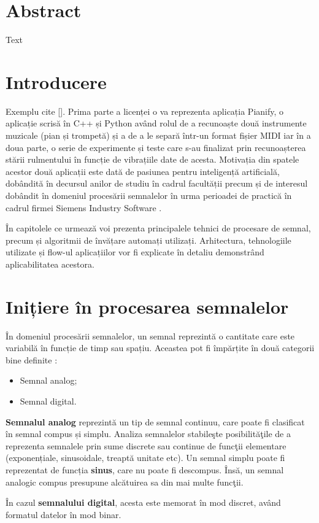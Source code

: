 \documentclass[a4paper,12pt]{report}
\begin{document}
	
	
	
	\newpage
	\tableofcontents
	\newpage
	\section{Abstract}
	Text
	\clearpage
	
	\section{Introducere}
	Exemplu cite [\cite{articol_ibima}]. Prima parte a licenței o va reprezenta aplicația Pianify, o aplicație scrisă în C++ și Python având rolul de a recunoaște două instrumente muzicale (pian și trompetă) și a de a le separă într-un format fișier MIDI iar în a doua parte, o serie de experimente și teste care s-au finalizat prin recunoașterea stării rulmentului în funcție de vibrațiile date de acesta. Motivația din spatele acestor două aplicații este dată de pasiunea pentru inteligență artificială, dobândită în decursul anilor de studiu în cadrul facultății precum și de interesul dobândit în domeniul procesării semnalelor în urma perioadei de practică în cadrul firmei Siemens Industry Software .
	
	În capitolele ce urmează voi prezenta principalele tehnici de procesare de semnal, precum și algoritmii de învățare automați utilizați. Arhitectura, tehnologiile utilizate și flow-ul aplicațiilor vor fi explicate în detaliu demonstrând aplicabilitatea acestora.
	
	\clearpage
	
    \section{Inițiere în procesarea semnalelor}
    În domeniul procesării semnalelor, un semnal reprezintă o cantitate care este variabilă în funcție de timp sau spațiu. Aceastea pot fi împărțite în două categorii bine definite \cite{analogVSdigital}: 
    
    \begin{itemize}
    	\item Semnal analog;
    	\item Semnal digital.
    \end{itemize}

    \textbf{Semnalul analog} reprezintă un tip de semnal continuu, care poate fi clasificat în semnal compus și simplu. Analiza semnalelor stabileşte posibilităţile de a reprezenta semnalele prin sume discrete sau continue de funcţii elementare (exponențiale, sinusoidale, treaptă unitate etc). Un semnal simplu poate fi reprezentat de funcția \textbf{sinus}, care nu poate fi descompus. Însă, un semnal analogic compus presupune alcătuirea sa din mai multe funcţii.
    \par
    În cazul \textbf{semnalului digital}, acesta este memorat în mod discret, având formatul datelor în mod binar.
    
\end{document}
